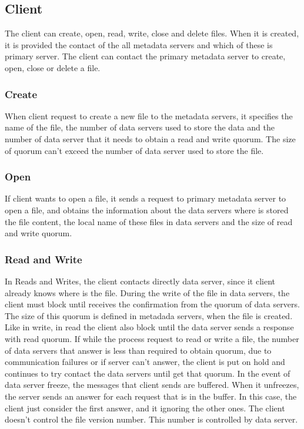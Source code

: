 \subsection{Client}

The client can create, open, read, write, close and delete files. When  it is created, it is provided the contact of the all metadata servers and which of these is primary server. 
The client can contact the primary metadata server to create, open, close or delete a file.

\subsubsection{Create} 

When client request to create a new file to the metadata servers, it specifies the name of the file, the number of data servers used to store the data and the number of data server that it needs to obtain a read and write quorum. The size of quorum can't exceed the number of data server used to store the file. 

\subsubsection{Open}

If client wants to open a file, it sends a request to primary metadata server to open a file, and obtains the information about the data servers where is stored the file content, the local name of these files in data servers and the size of read and write quorum.

\subsubsection{Read and Write}

In Reads and Writes, the client contacts directly data server, since it client already knows where is the file. During the write of the file in data servers, the client must block until receives the confirmation from the quorum of data servers. The size of this quorum is defined in metadada servers, when the file is created. Like in write, in read the client also block until the data server sends a response with read quorum.
If while the process request to read or write a file, the number of data servers that answer is less than required to obtain quorum, due to communication failures or if server can't answer, the client is put on hold and continues to try contact the data servers until get that quorum.
In the event of data server freeze, the messages that client sends are buffered. When it unfreezes, the server sends an answer for each request that is in the buffer. In this case, the client just consider the first answer, and it ignoring the other ones.
The client doesn't control the file version number. This number is controlled by data server.

